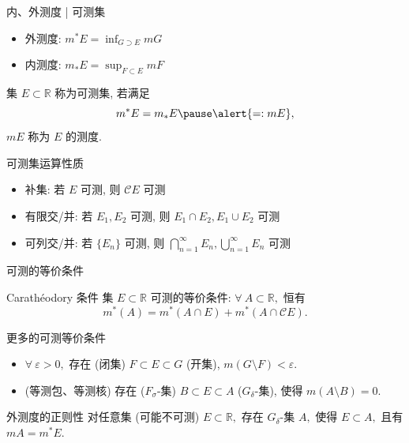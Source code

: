 \begin{frame}{内、外测度 | 可测集}

\begin{itemize}
\item 外测度: $\displaystyle m^* E = \inf_{G \supset E} m G$
\item 内测度: $\displaystyle m_* E = \sup_{F \subset E} m F$
\end{itemize}

\pause

\begin{Def}[可测集]
集 $E \subset \mathbb{R}$ 称为可测集, 若满足
\[m^* E = m_* E \pause \alert{=: m E},\]
$m E$ 称为 $E$ 的测度.
\end{Def}

\pause

\begin{block}{可测集运算性质}
\begin{itemize}
\item 补集: 若 $E$ 可测, 则 $\mathscr{C}E$ 可测
\item 有限交/并: 若 $E_1,E_2$ 可测, 则 $E_1 \cap E_2, E_1 \cup E_2$ 可测
\item 可列交/并: 若 $\{E_n\}$ 可测, 则 $\displaystyle \bigcap_{n=1}^{\infty}E_n, \bigcup_{n=1}^{\infty}E_n$ 可测
\end{itemize}
\end{block}

\end{frame}


\begin{frame}{可测的等价条件}

\begin{block}{Carathéodory 条件}
集 $E \subset \mathbb{R}$ 可测的等价条件: $\forall ~ A \subset \mathbb{R},$ 恒有
\[
m^*(A) = m^*(A \cap E) + m^*(A \cap \mathscr{C}E).
\]
\end{block}

\pause

\begin{block}{更多的可测等价条件}
\begin{itemize}
\item $\forall ~ \varepsilon > 0,$ 存在 (闭集) $F \subset E \subset G$ (开集), $m (G \setminus F) < \varepsilon.$
\pause
\item (\alert{等测包、等测核}) 存在 ($F_{\sigma}$-集) $B \subset E \subset A$ ($G_{\delta}$-集), 使得 $m (A \setminus B) = 0.$
\end{itemize}
\end{block}

\pause

\begin{block}{外测度的正则性}
对任意集 (\alert{可能不可测}) $E \subset \mathbb{R},$ 存在 $G_{\delta}$-集 $A,$ 使得 $E \subset A,$ 且有 $m A = m^* E.$
\end{block}

\end{frame}

